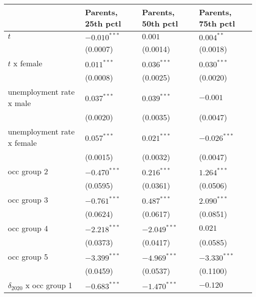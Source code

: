 \begin{tabular}{llll}
\toprule
{} & Parents, 25th pctl & Parents, 50th pctl & Parents, 75th pctl \\
\midrule
$t$                                    &     $-0.010^{***}$ &            $0.001$ &       $0.004^{**}$ \\
                                       &           (0.0007) &           (0.0014) &           (0.0018) \\
$t$ x female                           &      $0.011^{***}$ &      $0.036^{***}$ &      $0.030^{***}$ \\
                                       &           (0.0008) &           (0.0025) &           (0.0020) \\
unemployment rate x male               &      $0.037^{***}$ &      $0.039^{***}$ &           $-0.001$ \\
                                       &           (0.0020) &           (0.0035) &           (0.0047) \\
unemployment rate x female             &      $0.057^{***}$ &      $0.021^{***}$ &     $-0.026^{***}$ \\
                                       &           (0.0015) &           (0.0032) &           (0.0047) \\
occ group 2                            &     $-0.470^{***}$ &      $0.216^{***}$ &      $1.264^{***}$ \\
                                       &           (0.0595) &           (0.0361) &           (0.0506) \\
occ group 3                            &     $-0.761^{***}$ &      $0.487^{***}$ &      $2.090^{***}$ \\
                                       &           (0.0624) &           (0.0617) &           (0.0851) \\
occ group 4                            &     $-2.218^{***}$ &     $-2.049^{***}$ &            $0.021$ \\
                                       &           (0.0373) &           (0.0417) &           (0.0585) \\
occ group 5                            &     $-3.399^{***}$ &     $-4.969^{***}$ &     $-3.330^{***}$ \\
                                       &           (0.0459) &           (0.0537) &           (0.1100) \\
$\delta_{2020}$ x occ group 1          &     $-0.683^{***}$ &     $-1.470^{***}$ &           $-0.120$ \\

\end{tabular}
